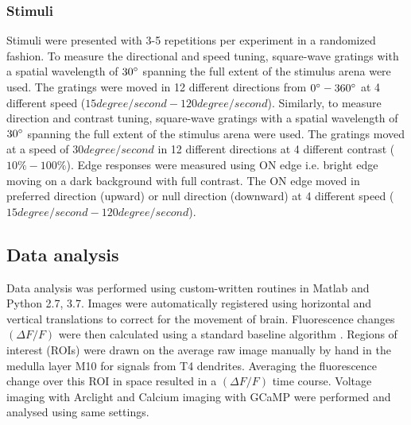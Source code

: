 \documentclass[9pt,lineno]{elife}
\begin{document}
\subsubsection{Stimuli}
Stimuli were presented with 3-5 repetitions per experiment in a randomized fashion. To measure the directional and speed tuning, square-wave gratings with a spatial wavelength of $30\degree$ spanning the full extent of the stimulus arena were used. The gratings were moved in 12 different directions from $0\degree - 360\degree$ at 4 different speed ($15degree/second - 120degree/second$). Similarly, to measure direction and contrast tuning, square-wave gratings with a spatial wavelength of $30\degree$ spanning the full extent of the stimulus arena were used. The gratings moved at a speed of $30degree/second$ in 12 different directions at 4 different contrast ($10\% - 100\%$). Edge responses were measured using ON edge i.e. bright edge moving on a dark background with full contrast. The ON edge moved in preferred direction (upward) or null direction (downward) at 4 different speed ($15degree/second - 120degree/second$).

\subsection{Data analysis}
Data analysis was performed using custom-written routines in Matlab and Python 2.7, 3.7. Images were automatically registered using horizontal and vertical translations to correct for the movement of brain. Fluorescence changes $(\Delta F/F)$ were then calculated using a standard baseline algorithm \parencite{Jia2011}. Regions of interest (ROIs) were drawn on the average raw image manually by hand in the medulla layer M10 for signals from T4 dendrites. Averaging the fluorescence change over this ROI in space resulted in a $(\Delta F/F)$ time course. Voltage imaging with Arclight and Calcium imaging with GCaMP were performed and analysed using same settings.

\printbibliography[heading=bibintoc]
\end{document}
